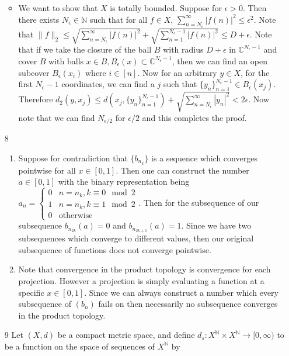 \documentclass[12pt, letterpaper]{article}
\newcommand{\N}{\mathbb{N}}
\newcommand{\C}{\mathbb{C}}
\begin{document}
\begin{enumerate}
\begin{itemize}
		\item We want to show that $X$ is totally bounded.  Suppose for $\epsilon > 0$.  Then there exists $N_\epsilon \in \N$ 
		such that for all $f \in X$, $\sum_{n = N_\epsilon}^\infty |f(n)|^2 \leq \epsilon^2 $.  Note that $\|f\|_2 \leq \sqrt{\sum_{n = N_\epsilon}^\infty |f(n)|^2 }  + \sqrt{\sum_{n =1}^{N_\epsilon - 1}|f(n)|^2 } \leq D + \epsilon$.  Note that if we 
		take the closure of the ball $B$ with radius $D + \epsilon$ in $\C^{N_\epsilon - 1}$ and 
		cover $B$ with balls $x \in B, B_{\epsilon}(x) \subset \C^{N_\epsilon - 1}$, then we can find an open subcover $B_\epsilon(x_i)$ where $i \in [n]$. Now for 
		an arbitrary $y \in X$, for the first $N_\epsilon - 1$ coordinates, we can find 
		a $j$ such that $\{y_n\}_{n=1}^{N_\epsilon - 1} \in B_{\epsilon}(x_j)$.  
		Therefore $d_2(y,x_j) \leq d(x_j, \{y_n\}_{n=1}^{N_\epsilon - 1}) + \sqrt{\sum_{n=N_\epsilon}^\infty |y_n|^2} < 2 \epsilon$.   Now note that we can find 
		$N_{\epsilon/2}$ for $\epsilon/2$ and this completes the proof.
 	\end{itemize}
	\item[8] 
	\begin{enumerate}
		\item Suppose for contradiction that $\{b_{n_k}\}$ is a sequence which converges 
		pointwise for all $x \in [0,1]$.  Then one can construct the number $a \in [0,1]$
		with the binary representation being $a_n = \begin{cases}0 & n = n_k, k \equiv 0 \mod{2} \\ 1 & n = n_k, k \equiv 1 \mod{2} \\ 0 & \text{otherwise} \end{cases}$.  
		Then for the subsequence of our subsequence $b_{n_{2k}}(a) = 0$ and 
		$b_{n_{2k+1}}(a) = 1$.  Since we have two subsequences which converge to different values, then our original subsequence of functions does not converge pointwise.
		\item Note that convergence in the product topology is convergence for each 
		projection.  However a projection is simply evaluating a function at a 
		specific $x \in [0,1]$.  Since we can always construct a number which every
		subsequence of $(b_n)$ fails on then necessarily no subsequence converges 
		in the product topology.  
	\end{enumerate}
	\item[9] Let $(X,d)$ be a compact metric space, and define
	$d_s:X^{\N} \times X^{\N} \to [0,\infty)$ to be a function on the space of sequences 
	of $X^\N$ by $$
$$
\end{enumerate}
\end{document}

